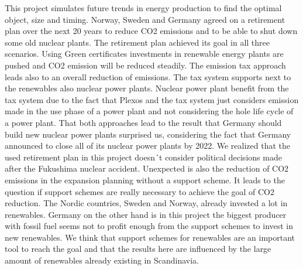 \documentclass{article}
\begin{document}
This project simulates future trends in energy production to find the optimal object, size and timing. Norway, Sweden and Germany agreed on a retirement plan over the next 20 years to reduce CO2 emissions and to be able to shut down some old nuclear plants. The retirement plan achieved its goal in all three scenarios. Using Green certificates investments in renewable energy plants are pushed and CO2 emission will be reduced steadily. The emission tax approach leads also to an overall reduction of emissions. The tax system supports next to the renewables also nuclear power plants. Nuclear power plant benefit from the tax system due to the fact that Plexos and the tax system just considers emission made in the use phase of a power plant and not considering the hole life cycle of a power plant. That both approaches lead to the result that Germany should build new nuclear power plants surprised us, considering the fact that Germany announced to close all of its nuclear power plants by 2022. We realized that the used retirement plan in this project doesn´t consider political decisions made after the Fukushima nuclear accident. Unexpected is also the reduction of CO2 emissions in the expansion planning without a support scheme. It leads to the question if support schemes are really necessary to achieve the goal of CO2 reduction. The Nordic countries, Sweden and Norway, already invested a lot in renewables. Germany on the other hand is in this project the biggest producer with fossil fuel seems not to profit enough from the support schemes to invest in new renewables. We think that support schemes for renewables are an important tool to reach the goal and that the results here are influenced by the large amount of renewables already existing in Scandinavia.


\newpage
\appendix
{}
\setcounter{page}{1}
\end{document}
